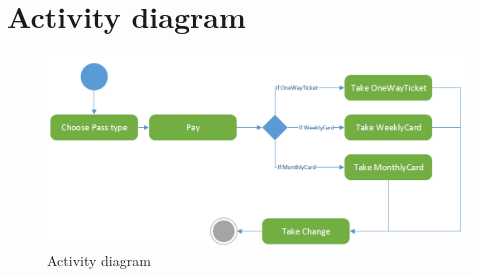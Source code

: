 \documentclass[pdftex,12pt,a4paper]{article}
\begin{document}
\section{Activity diagram}
\begin{figure}[h]
\centering
\includegraphics[scale = 0.7]{activity.png}
\caption{Activity diagram}
\end{figure}
\end{document}
